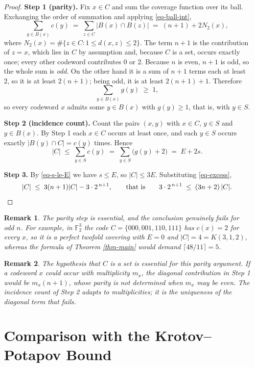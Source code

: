 \documentclass[10pt,a4paper]{article}
\newtheorem{remark}{Remark}[section]
\begin{document}
\begin{proof}
\textbf{Step 1 (parity).} Fix $x\in C$ and sum the coverage function over its
ball. Exchanging the order of summation and applying \eqref{eq-ball-int},
\[
  \sum_{y\in B(x)} c(y)
  \;=\; \sum_{z\in C} |B(x)\cap B(z)|
  \;=\; (n+1) + 2N_2(x),
\]
where $N_2(x)=\#\{z\in C: 1\le d(x,z)\le 2\}$. The term $n+1$ is the
contribution of $z=x$, which lies in $C$ by assumption and, because $C$ is a
set, occurs exactly once; every other codeword contributes $0$ or $2$. Because
$n$ is even, $n+1$ is odd, so the whole sum is \emph{odd}. On the other hand it
is a sum of $n+1$ terms each at least $2$, so it is at least $2(n+1)$; being
odd, it is at least $2(n+1)+1$. Therefore
\[
  \sum_{y\in B(x)} g(y)\;\ge\;1 ,
\]
so every codeword $x$ admits some $y\in B(x)$ with $g(y)\ge 1$, that is, with
$y\in S$.

\textbf{Step 2 (incidence count).} Count the pairs $(x,y)$ with $x\in C$,
$y\in S$ and $y\in B(x)$. By Step 1 each $x\in C$ occurs at least once, and each
$y\in S$ occurs exactly $|B(y)\cap C|=c(y)$ times. Hence
\[
  |C| \;\le\; \sum_{y\in S} c(y) \;=\; \sum_{y\in S}\bigl(g(y)+2\bigr)
      \;=\; E + 2s .
\]

\textbf{Step 3.} By \eqref{eq-s-le-E} we have $s\le E$, so $|C|\le 3E$.
Substituting \eqref{eq-excess},
\[
  |C| \;\le\; 3(n+1)|C| - 3\cdot 2^{\,n+1},
  \qquad\text{that is}\qquad
  3\cdot 2^{\,n+1} \;\le\; (3n+2)\,|C| . \qedhere
\]
\end{proof}

\begin{remark}\label{rem-parity}
The parity step is essential, and the conclusion genuinely fails for odd $n$.
For example, in $\mathbb{F}_2^3$ the code $C=\{000,001,110,111\}$ has $c(x)=2$
for every $x$,
so it is a perfect twofold covering with $E=0$ and $|C|=4=K(3,1,2)$, whereas the
formula of Theorem \ref{thm-main} would demand $\lceil 48/11\rceil=5$.
\end{remark}

\begin{remark}\label{rem-set}
The hypothesis that $C$ is a set is essential for this parity argument. If a
codeword $x$ could occur with multiplicity $m_x$, the diagonal contribution in
Step 1 would be $m_x(n+1)$, whose parity is not determined when $m_x$ may be
even. The incidence count of Step 2 adapts to multiplicities; it is the
uniqueness of the diagonal term that fails.
\end{remark}

\section{Comparison with the Krotov--Potapov Bound}\label{sec-dominance}
\end{document}
